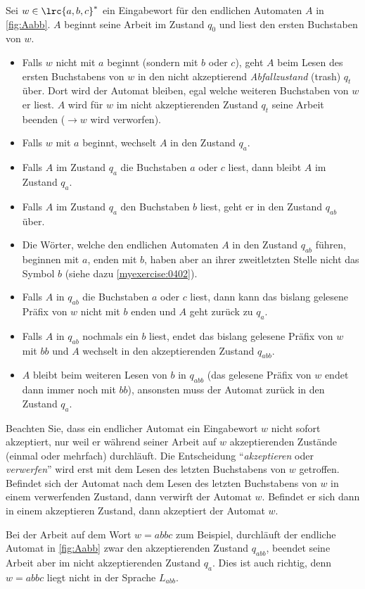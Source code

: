 \begin{myexample}
Sei $w\in\lrc{a,b,c}^*$ ein Eingabewort für den endlichen Automaten $A$ in \cref{fig:Aabb}. $A$ beginnt seine Arbeit im Zustand $q_0$ und liest den ersten Buchstaben von $w$.
\begin{itemize}
	\item Falls $w$ nicht mit $a$ beginnt (sondern mit $b$ oder $c$), geht $A$ beim Lesen des ersten Buchstabens von $w$ in den nicht akzeptierend \textit{Abfallzustand} (trash) $q_t$ über. Dort wird der Automat bleiben, egal welche weiteren Buchstaben von $w$ er liest. $A$ wird für $w$ im nicht akzeptierenden Zustand $q_t$ seine Arbeit beenden ($\to w$ wird verworfen).
	\item Falls $w$ mit $a$ beginnt, wechselt $A$ in den Zustand $q_a$.
	\item Falls $A$ im Zustand $q_a$ die Buchstaben $a$ oder $c$ liest, dann bleibt $A$ im Zustand $q_a$.
	\item Falls $A$ im Zustand $q_a$ den Buchstaben $b$ liest, geht er in den Zustand $q_{ab}$ über.
	\item Die Wörter, welche den endlichen Automaten $A$ in den Zustand $q_{ab}$ führen, beginnen mit $a$, enden mit $b$, haben aber an ihrer zweitletzten Stelle nicht das Symbol $b$ (siehe dazu \cref{myexercise:0402}).
	\item Falls $A$ in $q_{ab}$ die Buchstaben $a$ oder $c$ liest, dann kann das bislang gelesene Präfix von $w$ nicht mit $b$ enden und $A$ geht zurück zu $q_a$.
	\item Falls $A$ in $q_{ab}$ nochmals ein $b$ liest, endet das bislang gelesene Präfix von $w$ mit $bb$ und $A$ wechselt in den akzeptierenden Zustand $q_{abb}$.
	\item $A$ bleibt beim weiteren Lesen von $b$ in $q_{abb}$ (das gelesene Präfix von $w$ endet dann immer noch mit $bb$), ansonsten muss der Automat zurück in den Zustand $q_a$.
\end{itemize}
\end{myexample}

\begin{myremark}
	Beachten Sie, dass ein endlicher Automat ein Eingabewort $w$ nicht sofort akzeptiert, nur weil er während seiner Arbeit auf $w$ akzeptierenden Zustände (einmal oder mehrfach) durchläuft. Die Entscheidung \enquote{\textit{akzeptieren} oder \textit{verwerfen}} wird erst mit dem Lesen des letzten Buchstabens von $w$ getroffen. Befindet sich der Automat nach dem Lesen des letzten Buchstabens von $w$ in einem verwerfenden Zustand, dann verwirft der Automat $w$. Befindet er sich dann in einem akzeptieren Zustand, dann akzeptiert der Automat $w$.

	Bei der Arbeit auf dem Wort $w = abbc$ zum Beispiel, durchläuft der endliche Automat in \cref{fig:Aabb} zwar den akzeptierenden Zustand $q_{abb}$, beendet seine Arbeit aber im nicht akzeptierenden Zustand $q_a$. Dies ist auch richtig, denn $w = abbc$ liegt nicht in der Sprache $L_{abb}$.
\end{myremark}

